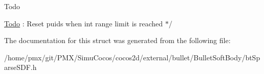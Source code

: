 \begin{DoxyRefDesc}{Todo}
\item[\hyperlink{todo__todo000038}{Todo}]\+: Reset puid\textquotesingle{}s when int range limit is reached $\ast$/ \end{DoxyRefDesc}


The documentation for this struct was generated from the following file\+:\begin{DoxyCompactItemize}
\item 
/home/pmx/git/\+P\+M\+X/\+Simu\+Cocos/cocos2d/external/bullet/\+Bullet\+Soft\+Body/bt\+Sparse\+S\+D\+F.\+h\end{DoxyCompactItemize}
